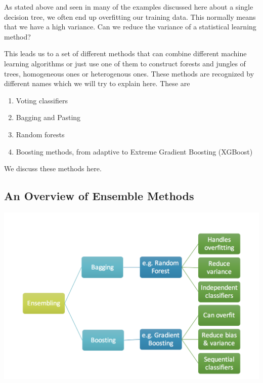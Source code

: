 \documentclass[%
oneside,                 %
final,                   %
10pt]{article}
\begin{document}
As stated above and seen in many of the examples discussed here about
a single decision tree, we often end up overfitting our training
data. This normally means that we have a high variance. Can we reduce
the variance of a statistical learning method?

This leads us to a set of different methods that can combine different
machine learning algorithms or just use one of them to construct forests and jungles of trees, homogeneous ones or heterogenous ones. These methods are recognized by different names which we will try to explain here. These are
\begin{enumerate}
\item Voting classifiers

\item Bagging and Pasting

\item Random forests

\item Boosting methods, from adaptive to Extreme Gradient Boosting (XGBoost)
\end{enumerate}

\noindent
We discuss these methods here.


\subsection*{An Overview of Ensemble Methods}



\vspace{6mm}

\centerline{\includegraphics[width=0.8\linewidth]{DataFiles/ensembleoverview.png}}

\vspace{6mm}
\end{document}
